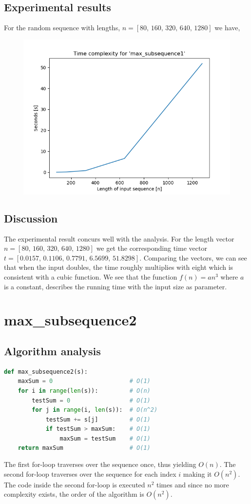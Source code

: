 \documentclass[12pt]{article}
\begin{document}
\subsection{Experimental results}
For the random sequence with lengths,
$n = [80,\,160,\, 320,\, 640,\, 1280]$ we have,
\begin{figure}[h]
\centering
\includegraphics[scale=0.52]{ms1.png}
\end{figure}
\subsection{Discussion}
The experimental result concurs well with the analysis. For the length vector $n = [80,\,160,\, 320,\, 640,\, 1280]$ we get the corresponding time vector $ t = [0.0157,\,0.1106,\, 0.7791,\, 6.5699,\, 51.8298]$. Comparing the vectors, we can see that when the input doubles, the time roughly multiplies with eight which is consistent with a cubic function.  We see that the function $f(n) = an^3$ where $a$ is a constant, describes the running time with the input size as parameter.

\newpage
\section{max\_subsequence2}
\subsection{Algorithm analysis}
\begin{lstlisting}[language=Python]
def max_subsequence2(s):
    maxSum = 0                      # O(1)
    for i in range(len(s)):         # O(n)
        testSum = 0                 # O(1)
        for j in range(i, len(s)):  # O(n^2)
            testSum += s[j]         # O(1)
            if testSum > maxSum:    # O(1)
                maxSum = testSum    # O(1)
    return maxSum                   # O(1)
\end{lstlisting}
The first for-loop traverses over the sequence once, thus yielding $O(n)$. The second for-loop  traverses over the sequence for each index $i$ making it $O(n^2)$. The code inside the second for-loop is executed $n^2$ times and since no more complexity exists, the order of the algorithm is $O(n^2)$.
\end{document}
